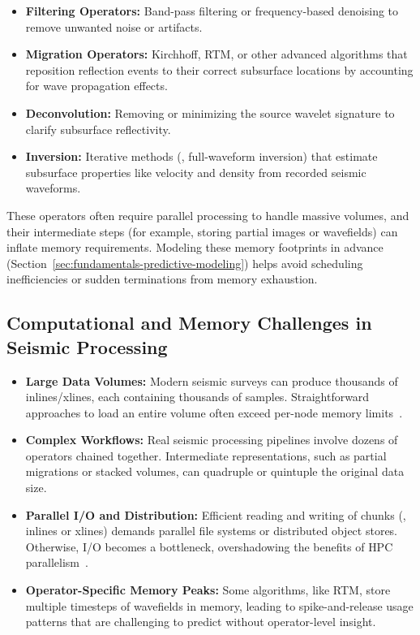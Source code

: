 \begin{itemize}
    \item \textbf{Filtering Operators:} Band-pass filtering or frequency-based denoising to remove unwanted noise or artifacts.
    \item \textbf{Migration Operators:} Kirchhoff, \ac{RTM}, or other advanced algorithms that reposition reflection events to their correct subsurface locations by accounting for wave propagation effects.
    \item \textbf{Deconvolution:} Removing or minimizing the source wavelet signature to clarify subsurface reflectivity.
    \item \textbf{Inversion:} Iterative methods (\eg, full-waveform inversion) that estimate subsurface properties like velocity and density from recorded seismic waveforms.
\end{itemize}

These operators often require parallel processing to handle massive volumes, and their intermediate steps (for example, storing partial images or wavefields) can inflate memory requirements.
Modeling these memory footprints in advance (Section~\ref{sec:fundamentals-predictive-modeling}) helps avoid scheduling inefficiencies or sudden terminations from memory exhaustion.

\subsection{Computational and Memory Challenges in Seismic Processing}
\label{subsec:fundamentals-seismic-challenges}

\begin{itemize}
    \item \textbf{Large Data Volumes:} Modern seismic surveys can produce thousands of inlines/xlines, each containing thousands of samples. Straightforward approaches to load an entire volume often exceed per-node memory limits~\cite{Yilmaz2001}.
    \item \textbf{Complex Workflows:} Real seismic processing pipelines involve dozens of operators chained together. Intermediate representations, such as partial migrations or stacked volumes, can quadruple or quintuple the original data size.
    \item \textbf{Parallel \ac{I/O} and Distribution:} Efficient reading and writing of chunks (\eg, inlines or xlines) demands parallel file systems or distributed object stores. Otherwise, \ac{I/O} becomes a bottleneck, overshadowing the benefits of \ac{HPC} parallelism~\cite{Folk2011}.
    \item \textbf{Operator-Specific Memory Peaks:} Some algorithms, like \ac{RTM}, store multiple timesteps of wavefields in memory, leading to spike-and-release usage patterns that are challenging to predict without operator-level insight.
\end{itemize}

